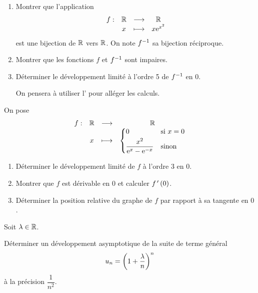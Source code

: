 \begin{corr}
\end{corr}

\begin{exo}[Exercice 9]
\begin{enumerate}
\item Montrer que l'application \[\begin{array}[t]{cccc}f : & \mathbb{R} & \longrightarrow & \mathbb{R} \\ & x & \longmapsto & x\mathrm{e}^{x^2}\end{array}\] est une bijection de \(\mathbb{R}\) vers \(\mathbb{R}\). On note \(f^{-1}\) sa bijection réciproque. \\

\item Montrer que les fonctions \(f\) et \(f^{-1}\) sont impaires. \\

\item Déterminer le développement limité à l'ordre 5 de \(f^{-1}\) en \(0\).

On pensera à utiliser l' pour alléger les calculs.
\end{enumerate}
\end{exo}

\begin{corr}
\end{corr}

\begin{exo}[Exercice 10]
On pose \[\begin{array}[t]{cccc}f : & \mathbb{R} & \longrightarrow & \mathbb{R} \\ & x & \longmapsto & \begin{dcases}
0 &\text{si }x=0 \\
\dfrac{x^2}{\mathrm{e}^{x}-\mathrm{e}^{-x}} &\text{sinon}
\end{dcases}\end{array}\]

\begin{enumerate}
\item Déterminer le développement limité de \(f\) à l'ordre 3 en \(0\). \\

\item Montrer que \(f\) est dérivable en \(0\) et calculer \(f^{\,\prime}\left(0\right)\). \\

\item Déterminer la position relative du graphe de \(f\) par rapport à sa tangente en \(0\).
\end{enumerate}
\end{exo}

\begin{corr}
\end{corr}

\begin{exo}[Exercice 11]
Soit \(\lambda\in\mathbb{R}\).

Déterminer un développement asymptotique de la suite de terme général \[u_n=\left(1+\dfrac{\lambda}{n}\right)^n\] à la précision \(\dfrac{1}{n^2}\).
\end{exo}

